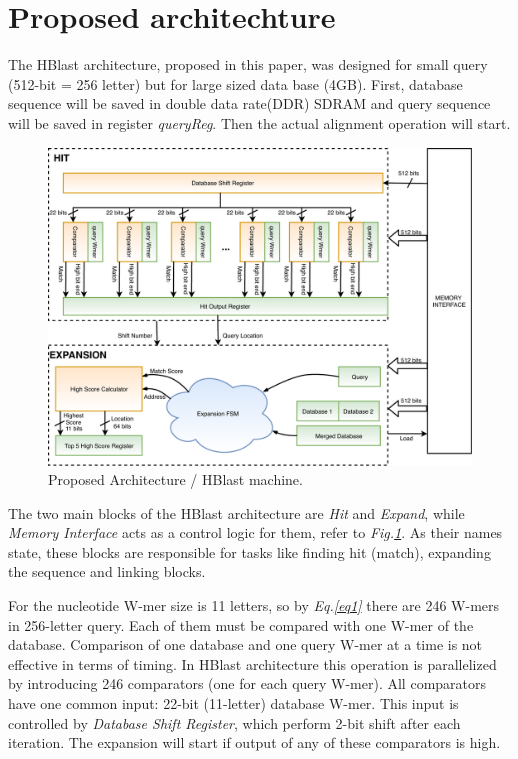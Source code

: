 \section{Proposed architechture}
\label{sec:propesedArch}

\quad The HBlast architecture, proposed in this paper, was designed for small query (512-bit = 256 letter) but for large sized data base (4GB).  First, database sequence will be saved in double data rate(DDR) SDRAM and query sequence will be saved in register \textit{queryReg}. Then the actual alignment operation will start. 
   
\begin{figure}[h!]
\centering
\includegraphics[width=1.2\textwidth]{Figures/BlastMachine.pdf}
\caption{Proposed Architecture / HBlast machine.} \label{fig:blastArch}
\end{figure}

The two main blocks of the HBlast architecture are \textit{Hit} and \textit{Expand}, while \textit{Memory Interface} acts as a control logic for them, refer to \textit{Fig.\ref{fig:blastArch}}. As their names state, these blocks are responsible for tasks like finding hit (match), expanding the sequence and linking blocks. 

For the nucleotide W-mer size is 11 letters, so by \textit{Eq.\ref{eq1}} there are 246 W-mers in 256-letter query. Each of them must be compared with one W-mer of the database.  Comparison of one database and one query W-mer at a time is not effective in terms of timing. In HBlast architecture this operation is parallelized by introducing 246 comparators (one for each query W-mer). All comparators have one common input: 22-bit (11-letter) database W-mer. This input is controlled by \textit{Database Shift Register}, which perform 2-bit shift after each iteration. The expansion will start if output of any of these comparators is high. 



